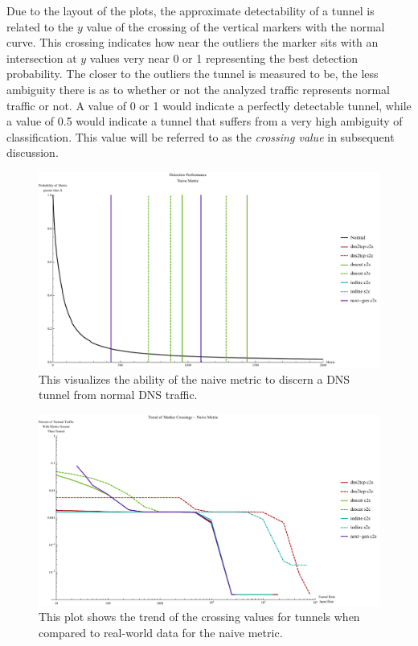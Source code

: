 \documentclass[12pt]{report}
\theoremstyle{remark}
\theoremstyle{definition}
\theoremstyle{definition}
\theoremstyle{definition}
\begin{document}
Due to the layout of the plots, the approximate detectability of a tunnel is
related to the $y$ value of the crossing of the vertical markers with the normal
curve. This crossing indicates how near the outliers the marker sits with an
intersection at $y$ values very near 0 or 1 representing the best detection
probability. The closer to the outliers the tunnel is measured to be, the less
ambiguity there is as to whether or not the analyzed traffic represents normal
traffic or not. A value of 0 or 1 would indicate a perfectly detectable tunnel,
while a value of 0.5 would indicate a tunnel that suffers from a very high
ambiguity of classification. This value will be referred to as the
\emph{crossing value} in subsequent discussion.

\begin{figure}
\centering
\includegraphics[width=\textwidth]{figures/mpnv.pdf}
\caption[Tunnel Detection Performance - Naive Metric]{This visualizes the
ability of the naive metric to discern a DNS tunnel from normal DNS traffic.}
\label{mpnv}
\end{figure}

\begin{figure}
\centering
\includegraphics[width=\textwidth]{figures/cnplot.pdf}
\caption[Trend of Crossing Value for Tunnels - Naive Metric]{This plot shows the
trend of the crossing values for tunnels when compared to real-world data for the
naive metric.}
\label{cnplot}
\end{figure}
\end{document}
